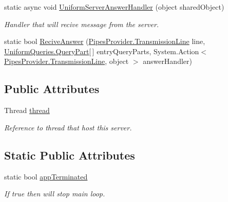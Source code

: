 \begin{DoxyCompactItemize}
static async void \mbox{\hyperlink{class_uniform_client_1_1_base_client_af7a3c613846c8595431272c4c9d531f3}{Uniform\+Server\+Answer\+Handler}} (object shared\+Object)
\begin{DoxyCompactList}\small\item\em Handler that will recive message from the server. \end{DoxyCompactList}\item 
static bool \mbox{\hyperlink{class_uniform_client_1_1_base_client_a06d3340dd02ec4abfe9cf55bc1db0f03}{Recive\+Answer}} (\mbox{\hyperlink{class_pipes_provider_1_1_transmission_line}{Pipes\+Provider.\+Transmission\+Line}} line, \mbox{\hyperlink{struct_uniform_queries_1_1_query_part}{Uniform\+Queries.\+Query\+Part}}\mbox{[}$\,$\mbox{]} entry\+Query\+Parts, System.\+Action$<$ \mbox{\hyperlink{class_pipes_provider_1_1_transmission_line}{Pipes\+Provider.\+Transmission\+Line}}, object $>$ answer\+Handler)
\end{DoxyCompactItemize}
\subsection*{Public Attributes}
\begin{DoxyCompactItemize}
\item 
Thread \mbox{\hyperlink{class_uniform_client_1_1_base_client_a458271823ca5e21612c0947e1db695a0}{thread}}
\begin{DoxyCompactList}\small\item\em Reference to thread that host this server. \end{DoxyCompactList}\end{DoxyCompactItemize}
\subsection*{Static Public Attributes}
\begin{DoxyCompactItemize}
\item 
static bool \mbox{\hyperlink{class_uniform_client_1_1_base_client_a1c02c6bb48c54e59c2581fe8097a4052}{app\+Terminated}}
\begin{DoxyCompactList}\small\item\em If true then will stop main loop. \end{DoxyCompactList}\end{DoxyCompactItemize}
